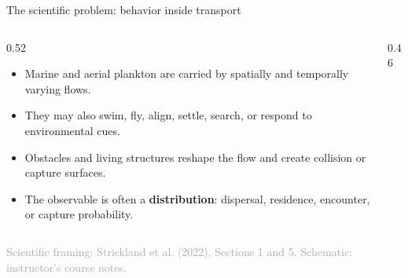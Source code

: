 \documentclass[aspectratio=169,11pt]{beamer}
\newcommand{\sourcecredit}[1]{\vfill\hfill{\tiny\textcolor{DarkGray}{#1}}}
\begin{document}
\begin{frame}{The scientific problem: behavior inside transport}
\begin{columns}[T,onlytextwidth]
  \begin{column}{0.52\textwidth}
    \begin{itemize}
      \item Marine and aerial plankton are carried by spatially and temporally varying flows.
      \item They may also swim, fly, align, settle, search, or respond to environmental cues.
      \item Obstacles and living structures reshape the flow and create collision or capture surfaces.
      \item The observable is often a \textbf{distribution}: dispersal, residence, encounter, or capture probability.
    \end{itemize}
  \end{column}
  \begin{column}{0.46\textwidth}
    \centering
  \end{column}
\end{columns}
\sourcecredit{Scientific framing: Strickland et al. (2022), Sections 1 and 5. Schematic: instructor's course notes.}
\end{frame}
\end{document}
